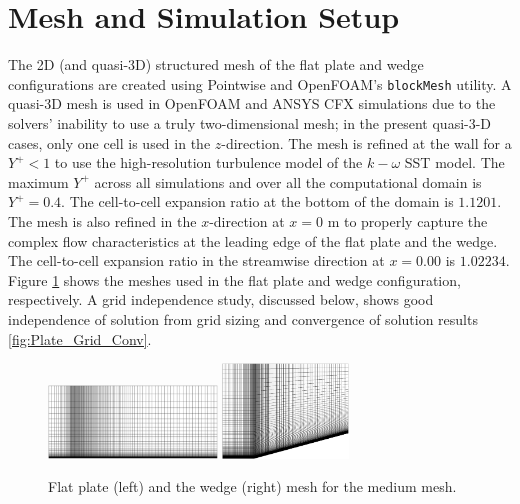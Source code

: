 \documentclass[journal ]{new-aiaa}
\begin{document}
\section{Mesh and Simulation Setup}
The 2D (and quasi-3D) structured mesh of the flat plate and wedge configurations are created using Pointwise and OpenFOAM's \texttt{blockMesh} utility. A quasi-3D mesh is used in OpenFOAM and ANSYS CFX simulations due to the solvers' inability to use a truly two-dimensional mesh; in the present quasi-3-D cases, only one cell is used in the $z$-direction. The mesh is refined at the wall for a $Y^+ < 1$ to use the high-resolution turbulence model of the $k-\omega$ SST model.  The maximum $Y^+$ across all simulations and over all the computational domain is $Y^+ = 0.4$. The cell-to-cell expansion ratio at the bottom of the domain is $1.1201$. The mesh is also refined in the $x$-direction at $x=0$ m to properly capture the complex flow characteristics at the leading edge of the flat plate and the wedge. The cell-to-cell expansion ratio in the streamwise direction at $x=0.00$ is $1.02234$. Figure \ref{fig:Flat_Plate_Mesh}  shows the meshes used in the flat plate and wedge configuration, respectively. A grid independence study, discussed below, shows good independence of solution from grid sizing and convergence of solution results \ref{fig:Plate_Grid_Conv}. 

\begin{figure}
\centering
  \includegraphics[width=0.4\textwidth]{Error/Plate_Medium.png}
  \hspace{1cm}
    \includegraphics[width=0.3\textwidth]{Error/wedge_fine.png}
  \caption{Flat plate (left) and the wedge (right) mesh for the medium mesh.}
  \label{fig:Flat_Plate_Mesh}
\end{figure}
\end{document}
